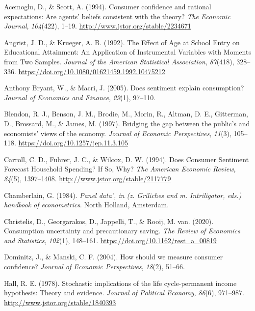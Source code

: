 \documentclass[
  abstract]{scrartcl}
\newlength{\cslhangindent}
\newenvironment{CSLReferences}[2] %
 {\begin{list}{}{%
  \setlength{\itemindent}{0pt}
  \setlength{\leftmargin}{0pt}
  \setlength{\parsep}{0pt}
  \ifodd #1
   \setlength{\leftmargin}{\cslhangindent}
   \setlength{\itemindent}{-1\cslhangindent}
  \fi
  \setlength{\itemsep}{#2\baselineskip}}}
 {\end{list}}
\begin{document}
\label{refs}
\begin{CSLReferences}{1}{0}
Acemoglu, D., \& Scott, A. (1994). Consumer confidence and rational
expectations: Are agents' beliefs consistent with the theory? \emph{The
Economic Journal}, \emph{104}(422), 1--19.
\url{http://www.jstor.org/stable/2234671}

Angrist, J. D., \& Krueger, A. B. (1992). The {Effect} of {Age} at
{School} {Entry} on {Educational} {Attainment}: {An} {Application} of
{Instrumental} {Variables} with {Moments} from {Two} {Samples}.
\emph{Journal of the American Statistical Association}, \emph{87}(418),
328--336. \url{https://doi.org/10.1080/01621459.1992.10475212}

Anthony Bryant, W., \& Macri, J. (2005). Does sentiment explain
consumption? \emph{Journal of Economics and Finance}, \emph{29}(1),
97--110.

Blendon, R. J., Benson, J. M., Brodie, M., Morin, R., Altman, D. E.,
Gitterman, D., Brossard, M., \& James, M. (1997). Bridging the gap
between the public's and economists' views of the economy. \emph{Journal
of Economic Perspectives}, \emph{11}(3), 105--118.
\url{https://doi.org/10.1257/jep.11.3.105}

Carroll, C. D., Fuhrer, J. C., \& Wilcox, D. W. (1994). Does {Consumer}
{Sentiment} {Forecast} {Household} {Spending}? {If} {So}, {Why}?
\emph{The American Economic Review}, \emph{84}(5), 1397--1408.
\url{http://www.jstor.org/stable/2117779}

Chamberlain, G. (1984). \emph{Panel data', in (z. Griliches and m.
Intriligator, eds.) handbook of econometrics}. North Holland, Amsterdam.

Christelis, D., Georgarakos, D., Jappelli, T., \& Rooij, M. van. (2020).
Consumption uncertainty and precautionary saving. \emph{The Review of
Economics and Statistics}, \emph{102}(1), 148--161.
\url{https://doi.org/10.1162/rest_a_00819}

Dominitz, J., \& Manski, C. F. (2004). How should we measure consumer
confidence? \emph{Journal of Economic Perspectives}, \emph{18}(2),
51--66.

Hall, R. E. (1978). Stochastic implications of the life cycle-permanent
income hypothesis: Theory and evidence. \emph{Journal of Political
Economy}, \emph{86}(6), 971--987.
\url{http://www.jstor.org/stable/1840393}


\end{CSLReferences}
\end{document}

